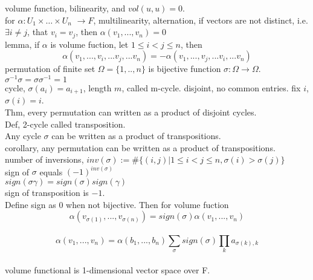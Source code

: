 \documentclass[paper=a4, fontsize=11pt]{scrartcl} %
\numberwithin{equation}{section} %
\numberwithin{figure}{section} %
\numberwithin{table}{section} %
\begin{document}
volume function, bilinearity, and $vol(u,u) = 0$.\\
for $\alpha : U_1\times\dots\times U_n$ $\rightarrow F$, multilinearity, alternation, if vectors are not distinct, i.e. $\exists i\neq j$, that $v_i=v_j$, then $\alpha(v_1,...,v_n)=0$\\
lemma, if $\alpha$ is volume fuction, let $1\leq i<j\leq n$, then
\begin{equation}
\alpha(v_1,...,v_i,...v_j,...v_n) = - \alpha(v_1,...,v_j,...v_i,...v_n)
\end{equation}
permutation of finite set $\Omega=\{1,..,n\}$ is bijective function $\sigma:\Omega\rightarrow\Omega$. $\sigma^{-1}\sigma = \sigma\sigma^{-1} = 1$\\
cycle, $\sigma (a_i)= a_{i+1}$, length $m$, called m-cycle. disjoint, no common entries. fix $i$, $\sigma(i) = i$.\\
Thm, every permutation can written as a product of disjoint cycles.\\
Def, 2-cycle called transposition.\\
Any cycle $\sigma$ can be written as a product of transpositions.\\
corollary, any permutation can be written as a product of transpositions.\\
number of inversions, $inv(\sigma):= \#\{(i,j)|1\leq i<j\leq n, \sigma(i)>\sigma(j)\}$\\
sign of $\sigma$ equals $(-1)^{inv(\sigma)}$\\
$sign(\sigma\gamma)= sign(\sigma)sign(\gamma)$\\
sign of transposition is $-1$.\\
Define sign as 0 when not bijective. Then for volume fuction
\begin{equation}
\alpha (v_{\sigma(1)},...,v_{\sigma(n)})= sign(\sigma)\alpha(v_1,...,v_n)
\end{equation}\\
\begin{equation}
\alpha(v_1,...,v_n) = \alpha(b_1,...,b_n)\sum_\sigma sign(\sigma)\prod_k a_{\sigma(k),k}
\end{equation}\\
volume functional is 1-dimensional vector space over F.
\end{document}

